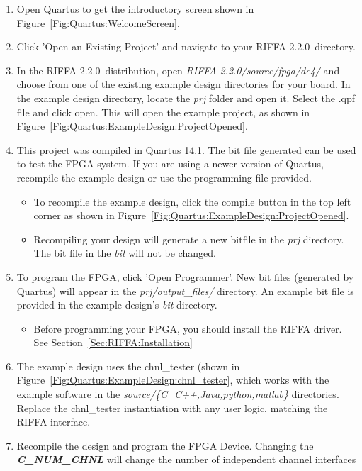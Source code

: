 \documentclass{refrep}
\newcommand{\QuartusVer}{14.1}
\newcommand{\RIFFAVer}{2.2.0}
\newcommand{\Directory}[1]{\textit{#1}}
\newcommand{\RIFFAParameter}[1]{\textit{\textbf{#1}}}
\begin{document}
\begin{enumerate}
\item Open Quartus to get the introductory screen shown in
  Figure~\ref{Fig:Quartus:WelcomeScreen}.
\item Click 'Open an Existing Project' and navigate to your RIFFA
  \RIFFAVer~directory.
\item In the RIFFA \RIFFAVer~distribution, open \Directory{RIFFA
  \RIFFAVer/source/fpga/de4/} and choose from one of the existing example design
  directories for your board. In the example design directory, locate the
  \Directory{prj} folder and open it. Select the .qpf file and click open. This
  will open the example project, as shown in
  Figure~\ref{Fig:Quartus:ExampleDesign:ProjectOpened}.
\item This project was compiled in Quartus \QuartusVer. The bit file generated
  can be used to test the FPGA system. If you are using a newer version of
  Quartus, recompile the example design or use the programming file provided.
  \begin{itemize}
  \item To recompile the example design, click the compile button in the top
    left corner as shown in
    Figure~\ref{Fig:Quartus:ExampleDesign:ProjectOpened}.
  \item Recompiling your design will generate a new bitfile in the
    \Directory{prj} directory. The bit file in the \Directory{bit} will not be
    changed.
  \end{itemize}
\item To program the FPGA, click 'Open Programmer'. New bit files (generated by
  Quartus) will appear in the \Directory{prj/output\_files/} directory. An example
  bit file is provided in the example design's \Directory{bit} directory.
  \begin{itemize}
  \item Before programming your FPGA, you should install the RIFFA driver. See
    Section~\ref{Sec:RIFFA:Installation}
  \end{itemize}
\item The example design uses the chnl\_tester (shown in
  Figure~\ref{Fig:Quartus:ExampleDesign:chnl_tester}, which works with
  the example software in the \Directory{source/\{C\_C++,Java,python,matlab\}}
  directories. Replace the chnl\_tester instantiation with any user logic,
  matching the RIFFA interface.
\item Recompile the design and program the FPGA Device. Changing the
  \RIFFAParameter{C\_NUM\_CHNL} will change the number of independent channel
  interfaces
\end{enumerate}
\end{document}
